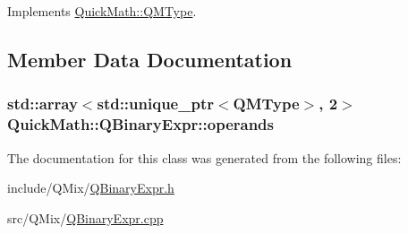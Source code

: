 Implements \hyperlink{classQuickMath_1_1QMType_a031b83c87e4edae28c65adf8e268442b}{Quick\+Math\+::\+Q\+M\+Type}.



\subsection{Member Data Documentation}
\hypertarget{classQuickMath_1_1QBinaryExpr_a9d788140e4b0eb6d635be7981bc8e60d}{}
\subsubsection[{operands}]{\setlength{\rightskip}{0pt plus 5cm}std\+::array$<$std\+::unique\+\_\+ptr$<${\bf Q\+M\+Type}$>$, 2$>$ Quick\+Math\+::\+Q\+Binary\+Expr\+::operands\hspace{0.3cm}{\ttfamily [protected]}}\label{classQuickMath_1_1QBinaryExpr_a9d788140e4b0eb6d635be7981bc8e60d}


The documentation for this class was generated from the following files\+:\begin{DoxyCompactItemize}
\item 
include/\+Q\+Mix/\hyperlink{QBinaryExpr_8h}{Q\+Binary\+Expr.\+h}\item 
src/\+Q\+Mix/\hyperlink{QBinaryExpr_8cpp}{Q\+Binary\+Expr.\+cpp}\end{DoxyCompactItemize}

